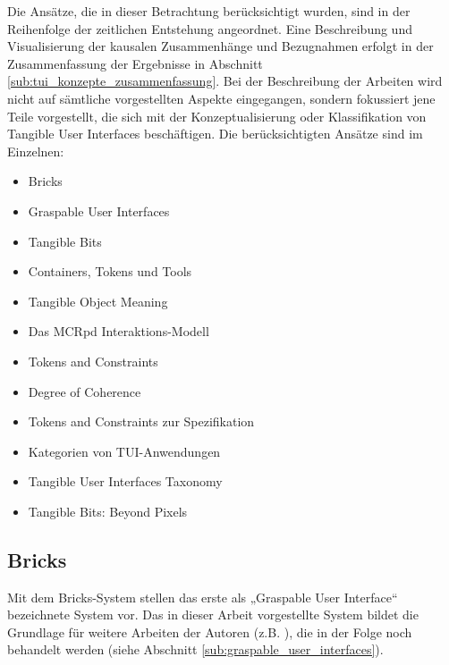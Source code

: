 Die Ansätze, die in dieser Betrachtung berücksichtigt wurden, sind in der Reihenfolge der zeitlichen Entstehung angeordnet. Eine Beschreibung und Visualisierung der kausalen Zusammenhänge und Bezugnahmen erfolgt in der Zusammenfassung der Ergebnisse in Abschnitt \ref{sub:tui_konzepte_zusammenfassung}. Bei der Beschreibung der Arbeiten wird nicht auf sämtliche vorgestellten Aspekte eingegangen, sondern fokussiert jene Teile vorgestellt, die sich mit der Konzeptualisierung oder Klassifikation von Tangible User Interfaces beschäftigen. Die berücksichtigten Ansätze sind im Einzelnen:

    \begin{itemize}
    	\item Bricks \citep{Fitzmaurice95}
    	\item Graspable User Interfaces \citep{Fitzmaurice96}
    	\item Tangible Bits \citep{Ishii97}
    	\item Containers, Tokens und Tools \citep{Holmquist99}
		\item Tangible Object Meaning \citep{Underkoffler99}
    	\item Das MCRpd Interaktions-Modell \citep{Ullmer00}
    	\item Tokens and Constraints \citep{Ullmer02}
    	\item Degree of Coherence \citep{Koleva03}
    	\item Tokens and Constraints zur Spezifikation \citep{Shaer04}
    	\item Kategorien von \gls{TUI}-Anwendungen \citep{Klemmer04}
    	\item Tangible User Interfaces Taxonomy \citep{Fishkin04}
    	\item Tangible Bits: Beyond Pixels \citep{Ishii08}
    \end{itemize}

\subsection{Bricks} %
\label{sub:bricks}

Mit dem Bricks-System stellen \citet{Fitzmaurice95} das erste als „Graspable User Interface“ bezeichnete System vor. Das in dieser Arbeit vorgestellte System bildet die Grundlage für weitere Arbeiten der Autoren (z.B. \citep{Fitzmaurice96}), die in der Folge noch behandelt werden (siehe Abschnitt \ref{sub:graspable_user_interfaces}). 

